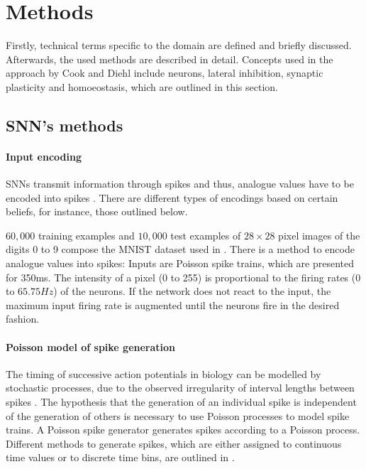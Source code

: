 \section{Methods}
\label{subsec:methods}

Firstly, technical terms specific to the domain are defined and briefly discussed.
Afterwards, the used methods are described in detail.
Concepts used in the approach by Cook and Diehl \cite{SNN} include  neurons, lateral inhibition, synaptic plasticity and homoeostasis, which are outlined in this section.



\subsection{\ac{SNN}'s methods}

\paragraph{\textbf{Input encoding}}
\acp{SNN} transmit information through spikes and thus, analogue values have to be encoded into spikes \cite{DIET_SNN}.
There are different types of encodings based on certain beliefs, 
for instance, those outlined below.

$60,000$ training examples and $10,000$ test examples of $28\times 28$ pixel images of the digits 0 to 9 compose the MNIST dataset used in 
\cite{SNN,ANN_SNN_conversion,RBM_SNN}.
There is a method to encode analogue values into spikes:
Inputs are Poisson spike trains, which are presented for 350ms.
The intensity of a pixel (0 to 255) is proportional to the firing rates (0 to $65.75 Hz$) of the neurons.
If the network does not react to the input, the maximum input firing rate is augmented until the neurons fire in the desired fashion. 


\paragraph{\textbf{Poisson model of spike generation}}
The timing of successive action potentials in biology can be modelled by stochastic processes, 
due to the observed irregularity of interval lengths between spikes \cite{poisson_spike_generation}.
The hypothesis that the generation of an individual spike is independent of the generation of others 
is necessary to use Poisson processes to model spike trains.
A Poisson spike generator generates spikes according to a Poisson process.
Different methods to generate spikes, which are either assigned to continuous time values or to discrete time bins,
 are outlined in \cite{poisson_spike_generation}.
 

